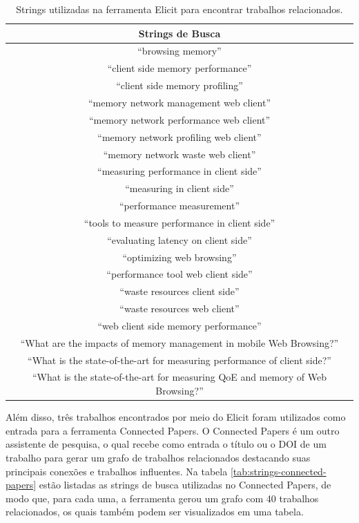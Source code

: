 \documentclass[12pt]{tcc}
\begin{document}
	\begin{table}[H]
	\centering
	\caption[Strings de busca utilizadas na ferramenta Elicit]{Strings utilizadas na ferramenta Elicit para encontrar trabalhos relacionados.\label{long}}
		\begin{tabular}{||c||} 
			
		\hline
			Strings de Busca \\
		\hline\hline
		``browsing memory'' \\
		``client side memory performance'' \\
		``client side memory profiling'' \\
		``memory network management web client'' \\
		``memory network performance web client'' \\
		``memory network profiling web client'' \\
		``memory network waste web client'' \\
		``measuring performance in client side'' \\
		``measuring in client side'' \\
		``performance measurement'' \\
		``tools to measure performance in client side'' \\
		``evaluating latency on client side'' \\
		``optimizing web browsing'' \\
		``performance tool web client side'' \\
		``waste resources client side'' \\
		``waste resources web client'' \\
		``web client side memory performance'' \\
		``What are the impacts of memory management in mobile Web Browsing?'' \\
		``What is the state-of-the-art for measuring performance of client side?'' \\
		``What is the state-of-the-art for measuring QoE and memory of Web Browsing?'' \\

		\hline
		\end{tabular}
	\label{tab:strings-elicit}
	\end{table}

	Além disso, três trabalhos encontrados por meio do Elicit foram utilizados como entrada para a ferramenta Connected Papers. O Connected Papers é um outro assistente de pesquisa, o qual recebe como entrada o título ou o DOI de um trabalho para gerar um grafo de trabalhos relacionados destacando suas principais conexões e trabalhos influentes.	Na tabela \ref{tab:strings-connected-papers} estão listadas as strings de busca utilizadas no Connected Papers, de modo que, para cada uma, a ferramenta gerou um grafo com 40 trabalhos relacionados, os quais também podem ser visualizados em uma tabela.
\end{document}
